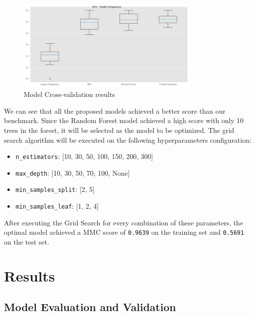 \documentclass[11pt]{article}
\providecommand{\tightlist}{%
      \setlength{\itemsep}{0pt}\setlength{\parskip}{0pt}}
\begin{document}
\begin{figure}[h]
\centering
\includegraphics[width=0.8\textwidth]{model_cross_val_trial.png}
\caption{Model Cross-validation results}
\label{fig:model_crossvall}
\end{figure}

We can see that all the proposed models achieved a better score than our
benchmark. Since the Random Forest model achieved a high score with only
10 trees in the forest, it will be selected as the model to be
optimized. The grid search algorithm will be executed on the following
hyperparameters configuration:

\begin{itemize}
\tightlist
\item
  \texttt{n\_estimators}: {[}10, 30, 50, 100, 150, 200, 300{]}
\item
  \texttt{max\_depth}: {[}10, 30, 50, 70, 100, None{]}
\item
  \texttt{min\_samples\_split}: {[}2, 5{]}
\item
  \texttt{min\_samples\_leaf}: {[}1, 2, 4{]}
\end{itemize}

After executing the Grid Search for every combination of these
parameters, the optimal model achieved a MMC score of \texttt{0.9639} on
the training set and \texttt{0.5691} on the test set.


\clearpage

    \hypertarget{iv.-results}{%
\section{Results}\label{iv.-results}}

\hypertarget{model-evaluation-and-validation}{%
\subsection{Model Evaluation and
Validation}\label{model-evaluation-and-validation}}
\end{document}
